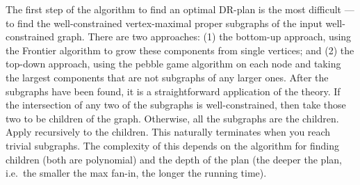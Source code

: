The first step of the algorithm to find an optimal DR-plan is the most difficult --- to find the well-constrained vertex-maximal proper subgraphs of the input well-constrained graph. There are two approaches: (1) the bottom-up approach, using the Frontier algorithm \cite{Oung:2001:FFE:376957.376995} to grow these components from single vertices; and (2) the top-down approach, using the pebble game algorithm \cite{Jacobs:1997:PG} on each node and taking the largest components that are not subgraphs of any larger ones. After the subgraphs have been found, it is a straightforward application of the theory. If the intersection of any two of the subgraphs is well-constrained, then take those two to be children of the graph. Otherwise, all the subgraphs are the children. Apply recursively to the children. This naturally terminates when you reach trivial subgraphs. The complexity of this depends on the algorithm for finding children (both are polynomial) and the depth of the plan (the deeper the plan, i.e.\ the smaller the max fan-in, the longer the running time). 
